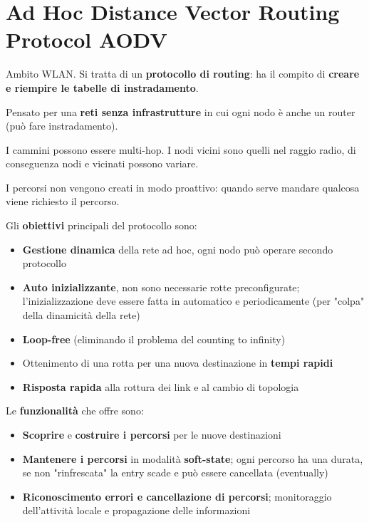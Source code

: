 
\section{Ad Hoc Distance Vector Routing Protocol AODV}

Ambito WLAN. Si tratta di un \textbf{protocollo di routing}: ha il compito di \textbf{creare e riempire le tabelle di instradamento}. 

Pensato per una \textbf{reti senza infrastrutture} in cui ogni nodo è anche un router (può fare instradamento). 

I cammini possono essere multi-hop. I nodi vicini sono quelli nel raggio radio, di conseguenza nodi e vicinati possono variare.

I percorsi non vengono creati in modo proattivo: quando serve mandare qualcosa viene richiesto il percorso.

Gli \textbf{obiettivi} principali del protocollo sono:
\begin{itemize}
	\item \textbf{Gestione dinamica} della rete ad hoc, ogni nodo può operare secondo protocollo

	\item \textbf{Auto inizializzante}, non sono necessarie rotte preconfigurate; l'inizializzazione deve essere fatta in automatico e periodicamente (per "colpa" della dinamicità della rete)

	\item \textbf{Loop-free} (eliminando il problema del counting to infinity)

	\item Ottenimento di una rotta per una nuova destinazione in \textbf{tempi rapidi}

	\item \textbf{Risposta rapida} alla rottura dei link e al cambio di topologia
\end{itemize}

Le \textbf{funzionalità} che offre sono:
\begin{itemize}
	\item \textbf{Scoprire} e \textbf{costruire i percorsi} per le nuove destinazioni
	
    \item \textbf{Mantenere i percorsi} in modalità \textbf{soft-state}; ogni percorso ha una durata, se non "rinfrescata" la entry scade e può essere cancellata (eventually)
	
    \item \textbf{Riconoscimento errori e cancellazione di percorsi}; monitoraggio dell'attività locale e propagazione delle informazioni
\end{itemize}

